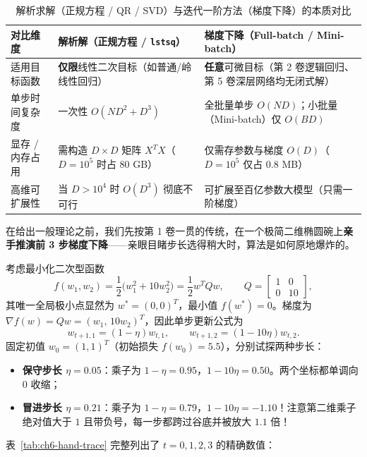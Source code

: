 \begin{table}[htbp]
\centering
\caption{解析求解（正规方程 / QR / SVD）与迭代一阶方法（梯度下降）的本质对比}
\label{tab:ch6-closed-vs-gd}
\small
\begin{tabularx}{\linewidth}{@{}p{24mm}p{58mm}X@{}}
\toprule
\textbf{对比维度} & \textbf{解析解（正规方程 / \texttt{lstsq}）} & \textbf{梯度下降（Full-batch / Mini-batch）} \\
\midrule
适用目标函数 & \textbf{仅限}线性二次目标（如普通/岭线性回归） & \textbf{任意}可微目标（第 2 卷逻辑回归、第 5 卷深层网络均无闭式解） \\
单步时间复杂度 & 一次性 $O(ND^2 + D^3)$ & 全批量单步 $O(ND)$；小批量（Mini-batch）仅 $O(BD)$ \\
显存 / 内存占用 & 需构造 $D\times D$ 矩阵 $X^T X$（$D=10^5$ 时占 80 GB） & 仅需存参数与梯度 $O(D)$（$D=10^5$ 仅占 0.8 MB） \\
高维可扩展性 & 当 $D > 10^4$ 时 $O(D^3)$ 彻底不可行 & 可扩展至百亿参数大模型（只需一阶梯度） \\
\bottomrule
\end{tabularx}
\end{table}

在给出一般理论之前，我们先按第 1 卷一贯的传统，在一个极简二维椭圆碗上\textbf{亲手推演前 3 步梯度下降}——亲眼目睹步长选得稍大时，算法是如何原地爆炸的。

\begin{example}\label{ex:ch6-hand-trace}
考虑最小化二次型函数
\[
  f(w_1, w_2) = \frac{1}{2}\big(w_1^2 + 10 w_2^2\big) = \frac{1}{2} w^T Q w,
  \qquad Q = \begin{bmatrix} 1 & 0 \\ 0 & 10 \end{bmatrix},
\]
其唯一全局极小点显然为 $w^* = (0, 0)^T$，最小值 $f(w^*) = 0$。梯度为 $\nabla f(w) = Qw = (w_1,\, 10w_2)^T$，因此单步更新公式为
\[
  w_{t+1,1} = (1 - \eta) w_{t,1},
  \qquad
  w_{t+1,2} = (1 - 10\eta) w_{t,2}.
\]
固定初值 $w_0 = (1, 1)^T$（初始损失 $f(w_0) = 5.5$），分别试探两种步长：
\begin{itemize}
  \item \textbf{保守步长 $\eta = 0.05$}：乘子为 $1-\eta = 0.95$，$1-10\eta = 0.50$。两个坐标都单调向 $0$ 收缩；
  \item \textbf{冒进步长 $\eta = 0.21$}：乘子为 $1-\eta = 0.79$，$1-10\eta = \mathbf{-1.10}$！注意第二维乘子绝对值大于 $1$ 且带负号，每一步都跨过谷底并被放大 $1.1$ 倍！
\end{itemize}
表~\ref{tab:ch6-hand-trace} 完整列出了 $t=0,1,2,3$ 的精确数值：
\end{example}


